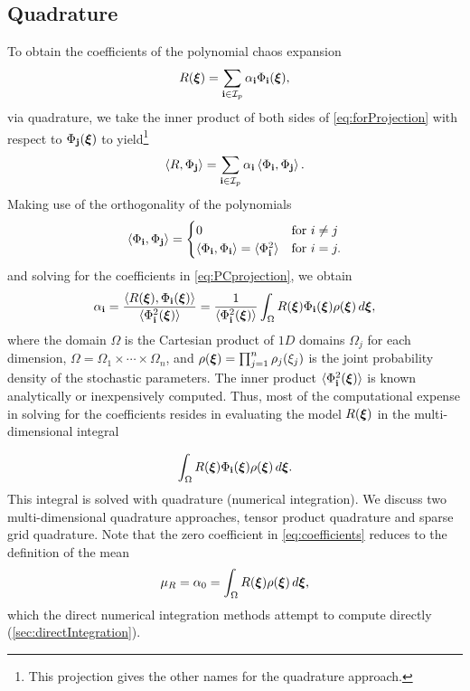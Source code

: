 \subsection{Quadrature}
\label{sec:PCcoeffQuad}
To obtain the coefficients of the polynomial chaos expansion
\begin{equation}
  R(\boldsymbol{\xi}) = \sum_{\mathbf{i}\in \mathcal{I}_p}  \alpha_{\mathbf{i}} \Phi_{\mathbf{i}}(\boldsymbol{\xi}),
  \label{eq:forProjection}
\end{equation}
via quadrature, we take the inner product of both sides of \cref{eq:forProjection} with respect to $\Phi_\mathbf{j}(\boldsymbol{\xi})$ to yield\footnote{This projection gives the other names for the quadrature approach.}
\begin{equation}
  \braket{R,\Phi_\mathbf{j}} = \sum_{\mathbf{i}\in \mathcal{I}_p}  \alpha_{\mathbf{i}}  \braket{\Phi_{\mathbf{i}}, \Phi_\mathbf{j}}.
  \label{eq:PCprojection}
\end{equation}
Making use of the orthogonality of the polynomials
\begin{equation}
  \braket{\Phi_{\mathbf{i}}, \Phi_\mathbf{j}} =
  \begin{cases}
    0 & \text{for } i\neq j \\
	\braket{\Phi_{\mathbf{i}}, \Phi_{\mathbf{i}}} =
      \braket{\Phi_{\mathbf{i}}^2} & \text{for } i = j.
  \end{cases}
\end{equation}
and solving for the coefficients in \cref{eq:PCprojection}, we obtain
\begin{equation}
  \alpha_{\mathbf{i}} = \frac{\braket{R(\boldsymbol{\xi}),\Phi_{\mathbf{i}}(\boldsymbol{\xi})}}{\braket{\Phi_{\mathbf{i}}^2(\boldsymbol{\xi})}} =
  \frac{1}{{\braket{\Phi_{\mathbf{i}}^2(\boldsymbol{\xi})}}}
  \int_\Omega R(\boldsymbol{\xi}) \Phi_{\mathbf{i}}(\boldsymbol{\xi}) \rho(\boldsymbol{\xi})\, d\boldsymbol{\xi},
  \label{eq:coefficients}
\end{equation}
where the domain $\Omega$ is the Cartesian product of $1D$ domains $\Omega_j$ for each dimension, $\Omega = \Omega_1 \times \cdots \times \Omega_n$, and $\rho(\boldsymbol{\xi}) = \prod_{j=1}^n\rho_j(\xi_j)$ is the joint probability density of the stochastic parameters. The inner product $\braket{\Phi_{\mathbf{i}}^2(\boldsymbol{\xi})}$ is known analytically or inexpensively computed. Thus, most of the computational expense in solving for the coefficients resides in evaluating the model $R(\boldsymbol{\xi})$ in the multi-dimensional integral

\begin{equation}
  \int_\Omega R(\boldsymbol{\xi}) \Phi_{\mathbf{i}}(\boldsymbol{\xi})
  \rho(\boldsymbol{\xi})\, d\boldsymbol{\xi}.
  \label{eq:integrand}
\end{equation}
This integral is solved with quadrature (numerical integration).  We discuss two multi-dimensional quadrature approaches, tensor product quadrature and sparse grid quadrature.
Note that the zero coefficient in \cref{eq:coefficients} reduces to the definition of the mean
\begin{equation}
  \mu_R = \alpha_0 = \int_\Omega R(\boldsymbol{\xi}) \rho(\boldsymbol{\xi})\, d\boldsymbol{\xi},
\end{equation}
which the direct numerical integration methods attempt to compute directly (\cref{sec:directIntegration}).

